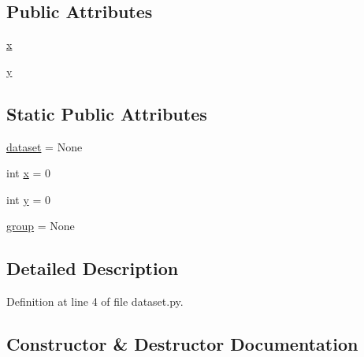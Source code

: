\subsection*{Public Attributes}
\begin{DoxyCompactItemize}
\item 
\hyperlink{classpylib_1_1dataset_1_1DatasetView_a70aafabce246167e781b95ae8d733774}{x}
\item 
\hyperlink{classpylib_1_1dataset_1_1DatasetView_a708943fe44d29f54ad72bc30490f2c13}{y}
\end{DoxyCompactItemize}
\subsection*{Static Public Attributes}
\begin{DoxyCompactItemize}
\item 
\hyperlink{classpylib_1_1dataset_1_1DatasetView_a1f520505fe1fca11cdc1f7ca3d24c24c}{dataset} = None
\item 
int \hyperlink{classpylib_1_1dataset_1_1DatasetView_ac281b8fa235dca4f9ecb469cb4b08536}{x} = 0
\item 
int \hyperlink{classpylib_1_1dataset_1_1DatasetView_a0d71819abf6d338331d407f80a0755b1}{y} = 0
\item 
\hyperlink{classpylib_1_1dataset_1_1DatasetView_af4af4bd5b3829761b402e3b0733f8260}{group} = None
\end{DoxyCompactItemize}


\subsection{Detailed Description}


Definition at line 4 of file dataset.\+py.



\subsection{Constructor \& Destructor Documentation}
